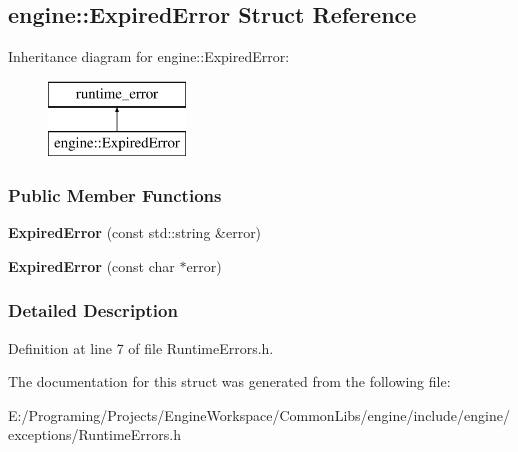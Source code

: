\hypertarget{a00037}{}\subsection{engine\+:\+:Expired\+Error Struct Reference}
\label{a00037}
Inheritance diagram for engine\+:\+:Expired\+Error\+:\begin{figure}[H]
\begin{center}
\leavevmode
\includegraphics[height=2.000000cm]{a00037}
\end{center}
\end{figure}
\subsubsection*{Public Member Functions}
\begin{DoxyCompactItemize}
\item 
{\bfseries Expired\+Error} (const std\+::string \&error)\hypertarget{a00037_ab18d5a73cd058d28d2ea936947fe0376}{}\label{a00037_ab18d5a73cd058d28d2ea936947fe0376}

\item 
{\bfseries Expired\+Error} (const char $\ast$error)\hypertarget{a00037_a653e8cc0b1b14f5629c9e1592fd487f1}{}\label{a00037_a653e8cc0b1b14f5629c9e1592fd487f1}

\end{DoxyCompactItemize}


\subsubsection{Detailed Description}


Definition at line 7 of file Runtime\+Errors.\+h.



The documentation for this struct was generated from the following file\+:\begin{DoxyCompactItemize}
\item 
E\+:/\+Programing/\+Projects/\+Engine\+Workspace/\+Common\+Libs/engine/include/engine/exceptions/Runtime\+Errors.\+h\end{DoxyCompactItemize}

